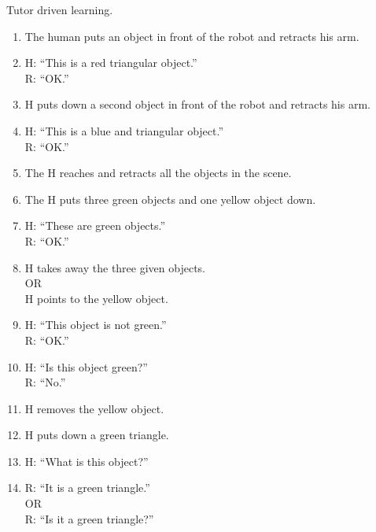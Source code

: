 \documentclass{article}
\begin{document}
\noindent
Tutor driven learning.
\begin{enumerate}
\item \label{lvl1:step1} The human puts an object in front of the
  robot and retracts his arm.
  
\item \label{lvl1:step2} 
  H: ``This is a red triangular object.''\\
  R: ``OK.''

\item \label{lvl1:step3} H puts down a second object in front of the
  robot and retracts his arm.

\item \label{lvl1:step4} 
  H: ``This is a blue and triangular object.''\\
  R: ``OK.''

\item \label{lvl1:step5} The H reaches and retracts all the objects in
  the scene.

\item \label{lvl1:step6} The H puts three green objects and one yellow
  object down.

\item \label{lv1:step7}
  H: ``These are green objects.''\\
  R: ``OK.''

\item \label{lvl1:step8}
  H takes away the three given objects. \\
  OR \\
  H points to the yellow object.

\item \label{lvl1:step9}
  H: ``This object is not green.''\\
  R: ``OK.''

\item \label{lvl1:step10}
  H: ``Is this object green?''\\
  R: ``No.''

\item \label{lvl1:step11}
  H removes the yellow object.

\item \label{lvl1:step12}
  H puts down a green triangle.

\item \label{lvl1:step13}
  H: ``What is this object?''

\item \label{lvl1:step14}
  R: ``It is a green triangle.'' \\
  OR\\
  R: ``Is it a green triangle?''

\end{enumerate}
\end{document}
